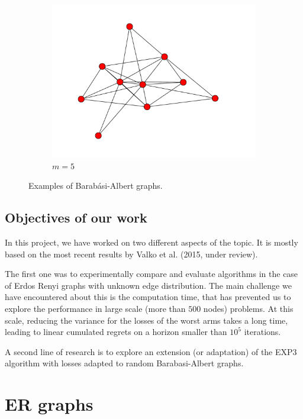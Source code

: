 \documentclass[10pt,a4paper]{scrartcl}
\begin{document}
\begin{figure}[h!]
\begin{center}
\begin{subfigure}[b]{0.3\textwidth}
                \includegraphics[width=\textwidth]{figures/BA_graph_5.pdf}
                \caption{$m=5$}
        \end{subfigure}
\end{center}
\caption{Examples of Barabási-Albert graphs.}
 \label{ba_ex}
\end{figure}



\subsection{Objectives of our work}

In this project, we have worked on two different aspects of the topic. It is mostly based on the most recent results by Valko et al. (2015, under review).

 The first one was to experimentally compare and evaluate algorithms in the case of Erdos Renyi graphs with unknown edge distribution. The main challenge we have encountered about this is the computation time, that has prevented us to explore the performance in large scale (more than $500$ nodes) problems. At this scale, reducing the variance for the losses of the worst arms takes a long time, leading to linear cumulated regrets on a horizon smaller than $10^5$ iterations.

A second line of research is to explore an extension (or adaptation) of the EXP3 algorithm with losses adapted to random Barabasi-Albert graphs.

\section{ER graphs}
\end{document}
